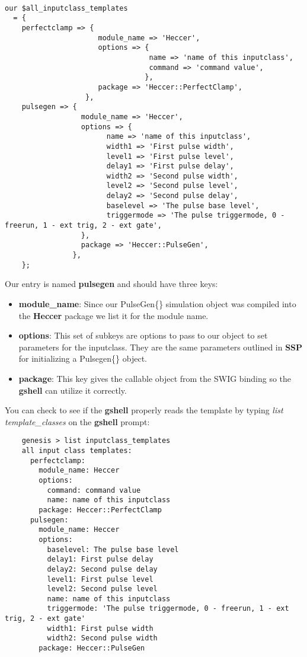 \documentclass[12pt]{article}
\begin{document}
\begin{verbatim}

our $all_inputclass_templates 
  = {
    perfectclamp => {
                      module_name => 'Heccer',
                      options => {
                                  name => 'name of this inputclass',
                                  command => 'command value',
                                 },
                      package => 'Heccer::PerfectClamp',
			       },
    pulsegen => {
                  module_name => 'Heccer',
				  options => {
					    name => 'name of this inputclass',
					    width1 => 'First pulse width',
					    level1 => 'First pulse level',
					    delay1 => 'First pulse delay',
					    width2 => 'Second pulse width',
					    level2 => 'Second pulse level',
					    delay2 => 'Second pulse delay',
					    baselevel => 'The pulse base level',
					    triggermode => 'The pulse triggermode, 0 - freerun, 1 - ext trig, 2 - ext gate',
				  },
                  package => 'Heccer::PulseGen',
                },
    };
\end{verbatim}

Our entry is named {\bf pulsegen} and should have three keys:

\begin{itemize}
\item[] {\bf module\_name}: Since our PulseGen\{\} simulation object was compiled into the {\bf Heccer} package we list it for the module name.
\item[] {\bf options}: This set of subkeys are options to pass to our object to set parameters for the inputclass. They are the same parameters outlined in {\bf SSP} for initializing a Pulsegen\{\} object.
\item[] {\bf package}: This key gives the callable object from the SWIG binding so the {\bf gshell} can utilize it correctly.
\end{itemize}

You can check to see if the {\bf gshell} properly reads the template by typing {\it list template\_classes} on the {\bf gshell} prompt:

\begin{verbatim}
	genesis > list inputclass_templates                                                          
	all input class templates:
	  perfectclamp:
	    module_name: Heccer
	    options:
	      command: command value
	      name: name of this inputclass
	    package: Heccer::PerfectClamp
	  pulsegen:
	    module_name: Heccer
	    options:
	      baselevel: The pulse base level
	      delay1: First pulse delay
	      delay2: Second pulse delay
	      level1: First pulse level
	      level2: Second pulse level
	      name: name of this inputclass
	      triggermode: 'The pulse triggermode, 0 - freerun, 1 - ext trig, 2 - ext gate'
	      width1: First pulse width
	      width2: Second pulse width
	    package: Heccer::PulseGen

\end{verbatim}
\end{document}

